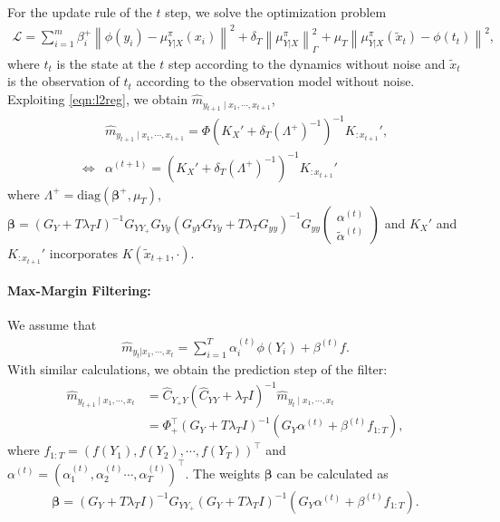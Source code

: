 \documentclass[a4paper]{article}
\newcommand{\up}{\mathrm}
\renewcommand{\cal}{\mathcal}
\newcommand{\bs}{\boldsymbol}
\newcommand{\norm}[1]{\left\lVert#1\right\rVert}
\newcommand{\T}{\intercal}
\begin{document}
For the update rule of the $t$ step, we solve the optimization problem
\begin{align}
\cal{L} = \sum_{i=1}^{m} \beta_i^+ \norm{\phi(y_i) - \mu_{Y|X}^\pi(x_i)}^2 + \delta_T\norm{\mu_{Y|X}^\pi}_\Gamma^2 + \mu_T \norm{\mu_{Y|X}^\pi(\tilde{x}_t) - \phi(t_t)}^2,
\end{align}
where $t_t$ is the state at the $t$ step according to the dynamics without noise and $\tilde{x}_t$ is the observation of $t_t$ according to the observation model without noise. Exploiting \eqref{eqn:l2reg}, we obtain $\hat{m}_{y_{t+1}\mid x_1,\cdots,x_{t+1}}$,
\begin{align}
&\hat{m}_{y_{t+1}\mid x_1,\cdots,x_{t+1}} = \Phi(K_X' + \delta_T (\Lambda^+)^{-1})^{-1} K_{:x_{t+1}}',\\
\Leftrightarrow& \alpha^{(t+1)} = (K_X' + \delta_T (\Lambda^+)^{-1})^{-1} K_{:x_{t+1}}'
\end{align}
where $\Lambda^+ = \up{diag}(\bs{\beta}^+,\mu_T)$, $\bs{\beta} = (G_Y + T\lambda_T I)^{-1}G_{YY_+}G_{Yy}(G_{yY}G_{Yy} + T\lambda_T G_{yy})^{-1}G_{yy} \begin{pmatrix}
\alpha^{(t)}\\
\tilde{\alpha}^{(t)}
\end{pmatrix}$ and $K_X'$ and $K_{:x_{t+1}}'$ incorporates $K(\tilde{x}_{t+1},\cdot)$.
\paragraph{Max-Margin Filtering:} We assume that 
\begin{align}
\hat{m}_{y_t|x_1,\cdots,x_t} = \sum_{i=1}^T \alpha_i^{(t)} \phi(Y_i) + \beta^{(t)} f.
\end{align}
With similar calculations, we obtain the prediction step of the filter:
\begin{align}
\hat{m}_{y_{t+1}\mid x_1,\cdots,x_t} &= \hat{C}_{Y_{+}Y}(\hat{C}_{YY}+\lambda_T I)^{-1}\hat{m}_{y_t\mid x_1,\cdots,x_t} \\
&= \Phi_+^\T (G_Y + T \lambda_T I)^{-1} (G_Y\alpha^{(t)} + \beta^{(t)}f_{1:T}),
\end{align}
where $f_{1:T} = (f(Y_1),f(Y_2),\cdots,f(Y_T))^\T$ and $\alpha^{(t)} = (\alpha_1^{(t)},\alpha_2^{(t)}\cdots,\alpha_T^{(t)})^\T$. The weights $\bs{\beta}$ can be calculated as
\begin{align}
\bs{\beta} = (G_Y + T\lambda_T I)^{-1}G_{YY_+}(G_Y + T \lambda_T I)^{-1} (G_Y\alpha^{(t)} + \beta^{(t)}f_{1:T}).
\end{align}
\end{document}

